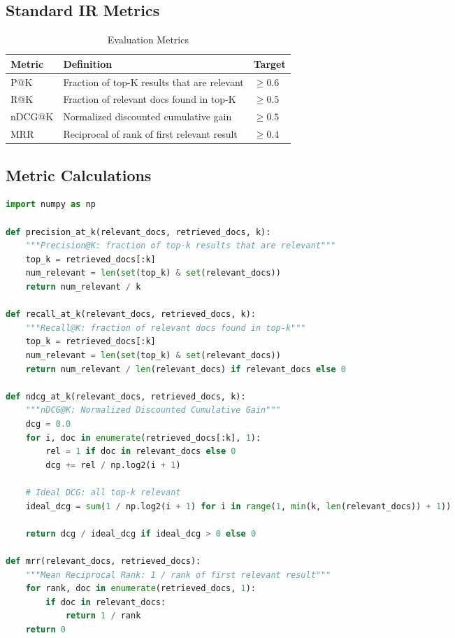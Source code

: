 \documentclass[12pt,a4paper]{report}
\begin{document}
\subsection{Standard IR Metrics}

\begin{table}[H]
    \centering
    \begin{tabular}{|p{1.5cm}|p{3cm}|p{2cm}|}
        \hline
        \textbf{Metric} & \textbf{Definition} & \textbf{Target} \\
        \hline
        P@K & Fraction of top-K results that are relevant & $\geq 0.6$ \\
        \hline
        R@K & Fraction of relevant docs found in top-K & $\geq 0.5$ \\
        \hline
        nDCG@K & Normalized discounted cumulative gain & $\geq 0.5$ \\
        \hline
        MRR & Reciprocal of rank of first relevant result & $\geq 0.4$ \\
        \hline
    \end{tabular}
    \caption{Evaluation Metrics}
\end{table}

\subsection{Metric Calculations}

\begin{lstlisting}[language=Python, caption=Evaluation Metrics Implementation]
import numpy as np

def precision_at_k(relevant_docs, retrieved_docs, k):
    """Precision@K: fraction of top-k results that are relevant"""
    top_k = retrieved_docs[:k]
    num_relevant = len(set(top_k) & set(relevant_docs))
    return num_relevant / k

def recall_at_k(relevant_docs, retrieved_docs, k):
    """Recall@K: fraction of relevant docs found in top-k"""
    top_k = retrieved_docs[:k]
    num_relevant = len(set(top_k) & set(relevant_docs))
    return num_relevant / len(relevant_docs) if relevant_docs else 0

def ndcg_at_k(relevant_docs, retrieved_docs, k):
    """nDCG@K: Normalized Discounted Cumulative Gain"""
    dcg = 0.0
    for i, doc in enumerate(retrieved_docs[:k], 1):
        rel = 1 if doc in relevant_docs else 0
        dcg += rel / np.log2(i + 1)
    
    # Ideal DCG: all top-k relevant
    ideal_dcg = sum(1 / np.log2(i + 1) for i in range(1, min(k, len(relevant_docs)) + 1))
    
    return dcg / ideal_dcg if ideal_dcg > 0 else 0

def mrr(relevant_docs, retrieved_docs):
    """Mean Reciprocal Rank: 1 / rank of first relevant result"""
    for rank, doc in enumerate(retrieved_docs, 1):
        if doc in relevant_docs:
            return 1 / rank
    return 0
\end{lstlisting}
\end{document}
